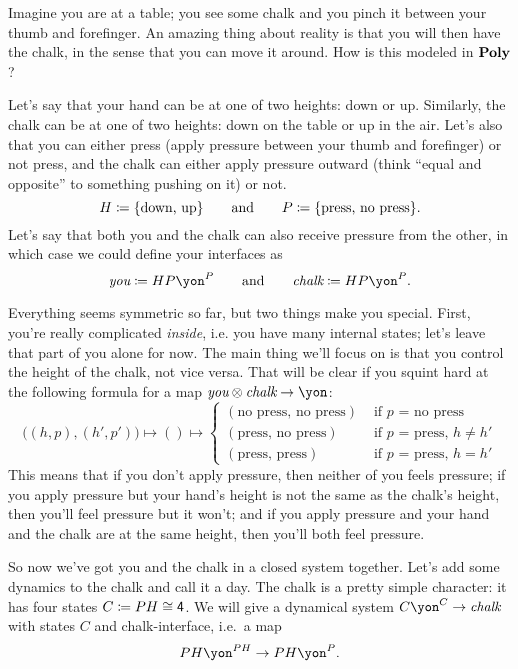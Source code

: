 \documentclass[Book-Poly]{subfiles}
\begin{document}
\begin{example}\label{ex.pickup_chalk}
Imagine you are at a table; you see some chalk and you pinch it between your thumb and forefinger. An amazing thing about reality is that you will then have the chalk, in the sense that you can move it around. How is this modeled in $\textbf{Poly}$?

Let's say that your hand can be at one of two heights: down or up. Similarly, the chalk can be at one of two heights: down on the table or up in the air. Let's also that you can either press (apply pressure between your thumb and forefinger) or not press, and the chalk can either apply pressure outward (think ``equal and opposite'' to something pushing on it) or not.
\[
	H\coloneqq\{\text{down, up}\}
	\qquad\text{and}\qquad
	P\coloneqq\{\text{press, no press}\}.
\]
Let's say that both you and the chalk can also receive pressure from the other, in which case we could define your interfaces as
\[
	\textit{you}\coloneqq HP\yon^P
	\qqand
	\textit{chalk}\coloneqq HP\yon^P.
\]

Everything seems symmetric so far, but two things make you special. First, you're really complicated \emph{inside}, i.e. you have many internal states; let's leave that part of you alone for now. The main thing we'll focus on is that you control the height of the chalk, not vice versa. That will be clear if you squint hard at the following formula for a map $\textit{you}\otimes\textit{chalk}\to\yon$:
\[
	\big((h, p), (h', p')\big)\mapsto ()\mapsto
	\begin{cases}
		(\text{no press, no press})&
			\text{ if $p$ = no press}\\
		(\text{press, no press})&
			\text{ if $p$ = press, $h\neq h'$}\\
		(\text{press, press})&
			\text{ if $p$ = press, $h=h'$}		
	\end{cases}
\]
This means that if you don't apply pressure, then neither of you feels pressure; if you apply pressure but your hand's height is not the same as the chalk's height, then you'll feel pressure but it won't; and if you apply pressure and your hand and the chalk are at the same height, then you'll both feel pressure.

So now we've got you and the chalk in a closed system together. Let's add some dynamics to the chalk and call it a day. The chalk is a pretty simple character: it has four states $C\coloneqq PH\cong\textsf{4}$. We will give a dynamical system $C\yon^C\to\textit{chalk}$ with states $C$ and chalk-interface, i.e.\ a map
\begin{equation}\label{eqn.chalk_dynamics}
	PH\yon^{PH}\to PH\yon^P.
\end{equation}


\end{example}
\end{document}
